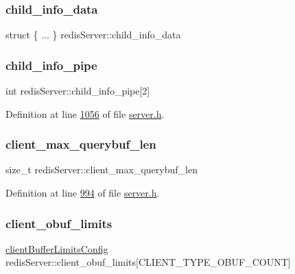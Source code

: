 \subsubsection{\texorpdfstring{child\+\_\+info\+\_\+data}{child\_info\_data}}
{\footnotesize\ttfamily struct \{ ... \}   redis\+Server\+::child\+\_\+info\+\_\+data}

\mbox{\label{structredisServer_a2b9b7cf47209653bdcecc638156ed603}} 
\subsubsection{\texorpdfstring{child\+\_\+info\+\_\+pipe}{child\_info\_pipe}}
{\footnotesize\ttfamily int redis\+Server\+::child\+\_\+info\+\_\+pipe\mbox{[}2\mbox{]}}



Definition at line \hyperlink{server_8h_source_l01056}{1056} of file \hyperlink{server_8h_source}{server.\+h}.

\mbox{\label{structredisServer_ac8257c71cfff960884029f7e5e9e451e}} 
\subsubsection{\texorpdfstring{client\+\_\+max\+\_\+querybuf\+\_\+len}{client\_max\_querybuf\_len}}
{\footnotesize\ttfamily size\+\_\+t redis\+Server\+::client\+\_\+max\+\_\+querybuf\+\_\+len}



Definition at line \hyperlink{server_8h_source_l00994}{994} of file \hyperlink{server_8h_source}{server.\+h}.

\mbox{\label{structredisServer_a05ef7ed8f9963a82ac702d63f3a614b2}} 
\subsubsection{\texorpdfstring{client\+\_\+obuf\+\_\+limits}{client\_obuf\_limits}}
{\footnotesize\ttfamily \hyperlink{structclientBufferLimitsConfig}{client\+Buffer\+Limits\+Config} redis\+Server\+::client\+\_\+obuf\+\_\+limits\mbox{[}C\+L\+I\+E\+N\+T\+\_\+\+T\+Y\+P\+E\+\_\+\+O\+B\+U\+F\+\_\+\+C\+O\+U\+NT\mbox{]}}



